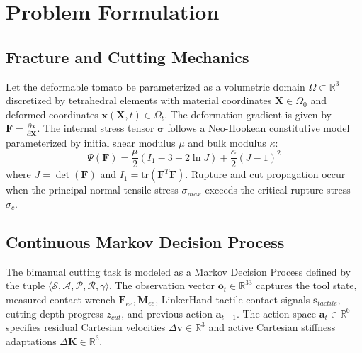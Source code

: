 \section{Problem Formulation}
\label{sec:problem_formulation}

\subsection{Fracture and Cutting Mechanics}
Let the deformable tomato be parameterized as a volumetric domain $\Omega \subset \mathbb{R}^3$ discretized by tetrahedral elements with material coordinates $\mathbf{X} \in \Omega_0$ and deformed coordinates $\mathbf{x}(\mathbf{X}, t) \in \Omega_t$. The deformation gradient is given by $\mathbf{F} = \frac{\partial \mathbf{x}}{\partial \mathbf{X}}$. The internal stress tensor $\boldsymbol{\sigma}$ follows a Neo-Hookean constitutive model parameterized by initial shear modulus $\mu$ and bulk modulus $\kappa$:
\begin{equation}
    \Psi(\mathbf{F}) = \frac{\mu}{2}(I_1 - 3 - 2\ln J) + \frac{\kappa}{2}(J - 1)^2
\end{equation}
where $J = \det(\mathbf{F})$ and $I_1 = \text{tr}(\mathbf{F}^T \mathbf{F})$. Rupture and cut propagation occur when the principal normal tensile stress $\sigma_{max}$ exceeds the critical rupture stress $\sigma_c$.

\subsection{Continuous Markov Decision Process}
The bimanual cutting task is modeled as a Markov Decision Process defined by the tuple $\langle \mathcal{S}, \mathcal{A}, \mathcal{P}, \mathcal{R}, \gamma \rangle$. 
The observation vector $\mathbf{o}_t \in \mathbb{R}^{33}$ captures the tool state, measured contact wrench $\mathbf{F}_{ee}, \mathbf{M}_{ee}$, LinkerHand tactile contact signals $\mathbf{s}_{tactile}$, cutting depth progress $z_{cut}$, and previous action $\mathbf{a}_{t-1}$.
The action space $\mathbf{a}_t \in \mathbb{R}^6$ specifies residual Cartesian velocities $\Delta \mathbf{v} \in \mathbb{R}^3$ and active Cartesian stiffness adaptations $\Delta \mathbf{K} \in \mathbb{R}^3$.
